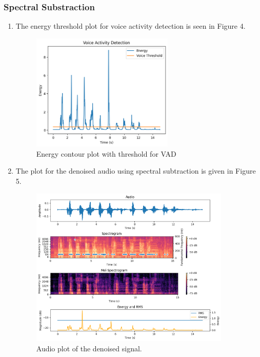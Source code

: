 \subsubsection{Spectral Substraction}
\begin{enumerate}
  \item The energy threshold plot for voice activity detection is seen in Figure 4.
  \begin{figure}
    \label{fig:VAD}
    \centering
    \includegraphics[width=0.64\textwidth]{voice_avctivity_detection.png}
    \caption{Energy contour plot with threshold for VAD}
  \end{figure}

  \item The plot for the denoised audio using spectral subtraction is given in Figure 5.
  \begin{figure}[b]
    \label{fig:denoised_plot}
    \centering
    \includegraphics[width=0.9\textwidth]{cleand_audio_plot.png}
    \caption{Audio plot of the denoised signal.}
  \end{figure}
\end{enumerate}

